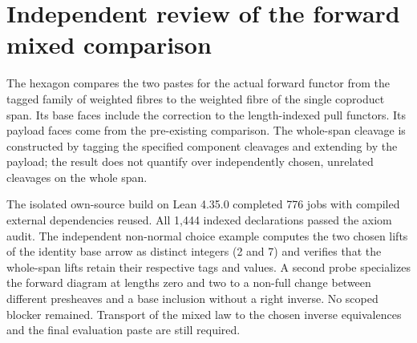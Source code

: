 \documentclass{article}
\begin{document}
\section*{Independent review of the forward mixed comparison}
The hexagon compares the two pastes for the actual forward functor from the tagged family of weighted fibres to the weighted fibre of the single coproduct span. Its base faces include the correction to the length-indexed pull functors. Its payload faces come from the pre-existing comparison. The whole-span cleavage is constructed by tagging the specified component cleavages and extending by the payload; the result does not quantify over independently chosen, unrelated cleavages on the whole span.
\par The isolated own-source build on Lean 4.35.0 completed 776 jobs with compiled external dependencies reused. All 1,444 indexed declarations passed the axiom audit. The independent non-normal choice example computes the two chosen lifts of the identity base arrow as distinct integers (2 and 7) and verifies that the whole-span lifts retain their respective tags and values. A second probe specializes the forward diagram at lengths zero and two to a non-full change between different presheaves and a base inclusion without a right inverse. No scoped blocker remained. Transport of the mixed law to the chosen inverse equivalences and the final evaluation paste are still required.
\end{document}
